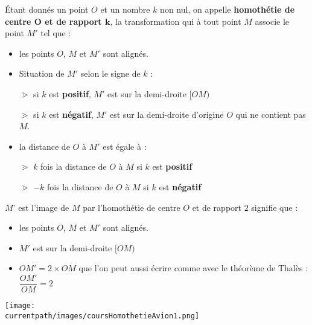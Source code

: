 \begin{definition}
    Étant donnés un point $O$ et un nombre $k$ non nul, on appelle \textbf{homothétie de centre $\mathbf{O}$ et de rapport $\mathbf{k}$}, la transformation qui à tout point $M$ associe le point $M'$ tel que :
    \begin{itemize}
        \item les points $O$, $M$ et $M'$ sont alignés.
        \item Situation de $M'$ selon le signe de $k$ :
        
        \hspace*{1cm}$\gtrdot$ si $k$ est \textbf{positif}, $M'$ est sur la demi-droite $[OM)$

        \hspace*{1cm}$\gtrdot$ si $k$ est \textbf{négatif}, $M'$ est sur la demi-droite d'origine $O$ qui ne contient pas $M$.
        \item la distance de $O$ à $M'$ est égale à :
        
        \hspace*{1cm}$\gtrdot$ $k$ fois la distance de $O$ à $M$ si $k$ est \textbf{positif}

        \hspace*{1cm}$\gtrdot$ $-k$ fois la distance de $O$ à $M$ si $k$ est \textbf{négatif}
    \end{itemize}
\end{definition}

\begin{exemple*1}

    $M’$ est l’image de $M$ par l’homothétie de centre $O$ et de rapport $2$ signifie que :
    \begin{itemize}
        \item les points $O$, $M$ et $M'$ sont alignés.
        \item $M'$ est sur la demi-droite $[OM)$
        \item $OM'=2\times OM$ que l'on peut aussi écrire comme avec le théorème de Thalès : $\dfrac{OM'}{OM}=2$
    \end{itemize}
    \begin{center}
        \texttt{[image: \\currentpath/images/coursHomothetieAvion1.png]} 
    \end{center}
\end{exemple*1}

